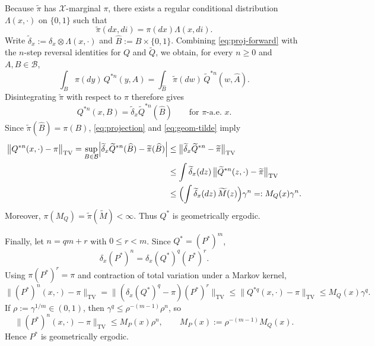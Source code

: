 \documentclass[mnsc,nonblindrev]{informs3}
\begin{document}
Because \(\widetilde\pi\) has \(\mathcal X\)-marginal \(\pi\), there exists a
regular conditional distribution \(\Lambda(x,\cdot)\) on \(\{0,1\}\) such that
\[
\widetilde\pi(dx,di)=\pi(dx)\Lambda(x,di).
\]
Write \(\widetilde\delta_x:=\delta_x\otimes\Lambda(x,\cdot)\) and
\(\widehat B:=B\times\{0,1\}\). Combining \eqref{eq:proj-forward} with the
\(n\)-step reversal identities for \(Q\) and \(\widetilde Q\), we obtain, for every
\(n\ge0\) and \(A,B\in\mathcal B\),
\[
\int_B \pi(dy)\,Q^{\ast n}(y,A)
=
\int_{\widehat B}\widetilde\pi(dw)\,
\widetilde Q^{\ast n}(w,\widehat A).
\]
Disintegrating \(\widetilde\pi\) with respect to \(\pi\) therefore gives
\begin{equation}\label{eq:projection}
Q^{\ast n}(x,B)=\widetilde\delta_x\widetilde Q^{\ast n}(\widehat B)
\qquad\text{for \(\pi\)-a.e.\ }x.
\end{equation}
Since \(\widetilde\pi(\widehat B)=\pi(B)\), \eqref{eq:projection} and
\eqref{eq:geom-tilde} imply
\begin{align*}
\bigl\|Q^{\ast n}(x,\cdot)-\pi\bigr\|_{\mathrm{TV}}
= \sup_{B\in\mathcal B}
   \Bigl|\widetilde\delta_x\widetilde Q^{\ast n}(\widehat B)
         -\widetilde\pi(\widehat B)\Bigr| &\le \bigl\|\widetilde\delta_x\widetilde Q^{\ast n}-\widetilde\pi
    \bigr\|_{\mathrm{TV}} \\
&\le \int \widetilde\delta_x(dz)\,
      \bigl\|\widetilde Q^{\ast n}(z,\cdot)-\widetilde\pi\bigr\|_{\mathrm{TV}} \\
&\le \Bigl(\int \widetilde\delta_x(dz)\,\widetilde M(z)\Bigr)\gamma^n
=: M_Q(x)\gamma^n.
\end{align*}
Moreover, $\pi(M_Q)=\widetilde\pi(\widetilde M)<\infty.$ Thus \(Q^\ast\) is geometrically ergodic.

Finally, let \(n=qm+r\) with \(0\le r<m\). Since \(Q^\ast=(P^\ast)^m\),
\[
\delta_x(P^\ast)^n=\delta_x(Q^\ast)^q(P^\ast)^r.
\]
Using \(\pi(P^\ast)^r=\pi\) and contraction of total variation under a Markov
kernel,
\[
\bigl\|(P^\ast)^n(x,\cdot)-\pi\bigr\|_{\mathrm{TV}}
=
\bigl\|(\delta_x(Q^\ast)^q-\pi)(P^\ast)^r\bigr\|_{\mathrm{TV}}
\le
\bigl\|Q^{\ast q}(x,\cdot)-\pi\bigr\|_{\mathrm{TV}}
\le M_Q(x)\gamma^q.
\]
If \(\rho:=\gamma^{1/m}\in(0,1)\), then \(\gamma^q\le \rho^{-(m-1)}\rho^n\), so
\[
\bigl\|(P^\ast)^n(x,\cdot)-\pi\bigr\|_{\mathrm{TV}}
\le M_P(x)\rho^n,
\qquad
M_P(x):=\rho^{-(m-1)}M_Q(x).
\]
Hence \(P^\ast\) is geometrically ergodic.
\end{document}
